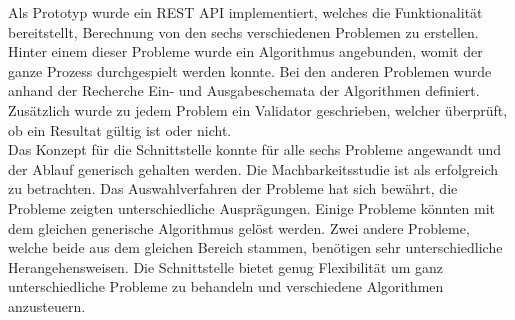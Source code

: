 Als Prototyp wurde ein REST API implementiert, welches die Funktionalität bereitstellt, Berechnung von den sechs verschiedenen Problemen zu erstellen. Hinter einem dieser Probleme wurde ein 
Algorithmus angebunden, womit der ganze Prozess durchgespielt werden konnte. Bei den anderen Problemen wurde anhand der Recherche Ein- und Ausgabeschemata der Algorithmen definiert. 
Zusätzlich wurde zu jedem Problem ein Validator geschrieben, welcher überprüft, ob ein Resultat gültig ist oder nicht.\\

Das Konzept für die Schnittstelle konnte für alle sechs Probleme angewandt und der Ablauf generisch gehalten werden. Die Machbarkeitsstudie ist als erfolgreich zu betrachten. Das 
Auswahlverfahren der Probleme hat sich bewährt, die Probleme zeigten unterschiedliche Ausprägungen. Einige Probleme könnten mit dem gleichen generische Algorithmus gelöst werden. Zwei 
andere Probleme, welche beide aus dem gleichen Bereich stammen, benötigen sehr unterschiedliche Herangehensweisen. Die Schnittstelle bietet genug Flexibilität um ganz unterschiedliche 
Probleme zu behandeln und verschiedene Algorithmen anzusteuern.